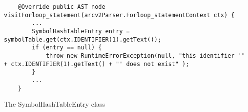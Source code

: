 \begin{listing}[htb!]
    \begin{verbatim}
    @Override public AST_node visitForloop_statement(arcv2Parser.Forloop_statementContext ctx) { 
        ...
        SymbolHashTableEntry entry = symbolTable.get(ctx.IDENTIFIER(1).getText());
        if (entry == null) {
            throw new RuntimeErrorException(null, "this identifier '" + ctx.IDENTIFIER(1).getText() + "' does not exist" );
        }
        ...
    }
    \end{verbatim}
    \caption{The SymbolHashTableEntry class}
    \label{lst:ScopeImplementationExample}
\end{listing}